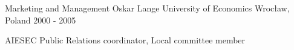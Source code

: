 

\begin{cventries}

  \cventry
    {Marketing and Management} %
    {Oskar Lange University of Economics} %
    {Wrocław, Poland} %
    {2000 - 2005} %
    {
      \begin{cvitems} %
        \item {AIESEC Public Relations coordinator, Local committee member}
      \end{cvitems}
    }

\end{cventries}
